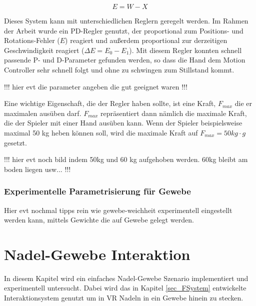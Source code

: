 \begin{equation}
E = W - X
\label{form_error}
\end{equation}

Dieses System kann mit unterschiedlichen Reglern geregelt werden. Im Rahmen der Arbeit wurde ein PD-Regler genutzt, der proportional zum Positions- und Rotations-Fehler ($E$) reagiert und außerdem proportional zur derzeitigen Geschwindigkeit reagiert ($\Delta E = E_0 - E_1$). Mit diesem Regler konnten schnell passende P- und D-Parameter gefunden werden, so dass die Hand dem Motion Controller sehr schnell folgt und ohne zu schwingen zum Stillstand kommt.

!!! hier evt die parameter angeben die gut geeignet waren !!!

Eine wichtige Eigenschaft, die der Regler haben sollte, ist eine Kraft, $F_{max}$ die er maximalen ausüben darf. $F_{max}$ repräsentiert dann nämlich die maximale Kraft, die der Spieler mit einer Hand ausüben kann. Wenn der Spieler beispielsweise maximal 50 kg heben können soll, wird die maximale Kraft auf $F_{max} = 50kg \cdot g$ gesetzt.

!!! hier evt noch bild indem 50kg und 60 kg aufgehoben werden. 60kg bleibt am boden liegen usw... !!!

\subsubsection{Experimentelle Parametrisierung für Gewebe}

Hier evt nochmal tipps rein wie gewebe-weichheit experimentell eingestellt werden kann, mittels Gewichte die auf Gewebe gelegt werden.

\section{Nadel-Gewebe Interaktion}%
\label{sec_needle}


In diesem Kapitel wird ein einfaches Nadel-Gewebe Szenario implementiert und experimentell untersucht. Dabei wird das in Kapitel \ref{sec_FSystem} entwickelte Interaktionsystem genutzt um in VR Nadeln in ein Gewebe hinein zu stecken. 

